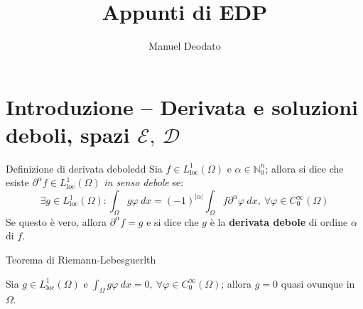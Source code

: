 \documentclass[10pt, a4paper]{scrartcl}
\title{Appunti di EDP}
\author{Manuel Deodato}
\date{}
\theoremstyle{definition}
\numberwithin{esempio}{section}
\theoremstyle{definition}
\numberwithin{obs}{section}
\numberwithin{nota}{section}
\renewcommand{\maketitle}{
\begin{center}
{\sffamily
{\fontsize{20}{20}\selectfont\MakeUppercase\thetitle}}

\vspace{0.2in}

{\large\scshape\sffamily\theauthor}
\end{center}
}
\numberwithin{equation}{subsection}
\begin{document}
\maketitle
\tableofcontents 
\newpage
\section{Introduzione -- Derivata e soluzioni deboli, spazi $\mathcal{E}, \ \mathcal{D}$}
\begin{definizione}{Definizione di derivata debole}{dd}
	Sia $f\in L^1_\text{loc}(\Omega )$ e $\alpha  \in \mathbb{N}_0^n$; allora si dice che esiste $\partial ^\alpha  f \in L^1_\text{loc}(\Omega ) $ \textit{in senso debole} se:
	\begin{equation}
		\exists g \in L^1_\text{loc}(\Omega ) : \int_{\Omega } g \varphi \ dx = (-1)^{\left\lvert \alpha  \right\rvert } \int_{\Omega } f \partial ^\alpha  \varphi  \ dx, \ \forall \varphi \in C_0^\infty (\Omega )
	\end{equation}
	Se questo \`e vero, allora $\partial ^\alpha  f =g$ e si dice che $g$ \`e la \textbf{derivata debole} di ordine $\alpha $ di $f$.
\end{definizione}

\begin{teorema}{Teorema di Riemann-Lebesgue}{rlth}

	Sia $g \in L^1_\text{loc}(\Omega )$ e $\int_{\Omega } g \varphi  \ dx = 0, \ \forall \varphi  \in C_0^\infty(\Omega )$; allora $g= 0$ quasi ovunque in $\Omega $.
\end{teorema}
\end{document}
